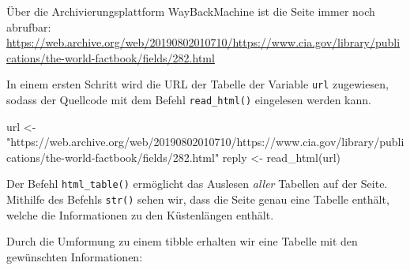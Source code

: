 \documentclass[
  ngerman,
]{article}
\newenvironment{Shaded}{\begin{snugshade}}{\end{snugshade}}
\newcommand{\AttributeTok}[1]{\textcolor[rgb]{0.77,0.63,0.00}{#1}}
\newcommand{\ConstantTok}[1]{\textcolor[rgb]{0.00,0.00,0.00}{#1}}
\newcommand{\DocumentationTok}[1]{\textcolor[rgb]{0.56,0.35,0.01}{\textbf{\textit{#1}}}}
\newcommand{\FunctionTok}[1]{\textcolor[rgb]{0.00,0.00,0.00}{#1}}
\newcommand{\NormalTok}[1]{#1}
\newcommand{\OtherTok}[1]{\textcolor[rgb]{0.56,0.35,0.01}{#1}}
\newcommand{\StringTok}[1]{\textcolor[rgb]{0.31,0.60,0.02}{#1}}
\begin{document}
Über die Archivierungsplattform WayBackMachine ist die Seite immer noch abrufbar: \url{https://web.archive.org/web/20190802010710/https://www.cia.gov/library/publications/the-world-factbook/fields/282.html}

In einem ersten Schritt wird die URL der Tabelle der Variable \texttt{url} zugewiesen, sodass der Quellcode mit dem Befehl \texttt{read\_html()} eingelesen werden kann.

\begin{Shaded}
\begin{Highlighting}[]
\NormalTok{url }\OtherTok{\textless{}{-}} \StringTok{"https://web.archive.org/web/20190802010710/https://www.cia.gov/library/publications/the{-}world{-}factbook/fields/282.html"}
\NormalTok{reply }\OtherTok{\textless{}{-}} \FunctionTok{read\_html}\NormalTok{(url)}
\end{Highlighting}
\end{Shaded}

Der Befehl \texttt{html\_table()} ermöglicht das Auslesen \emph{aller} Tabellen auf der Seite. Mithilfe des Befehls \texttt{str()} sehen wir, dass die Seite genau eine Tabelle enthält, welche die Informationen zu den Küstenlängen enthält.

\begin{Shaded}
\end{Shaded}

Durch die Umformung zu einem tibble erhalten wir eine Tabelle mit den gewünschten Informationen:
\end{document}
